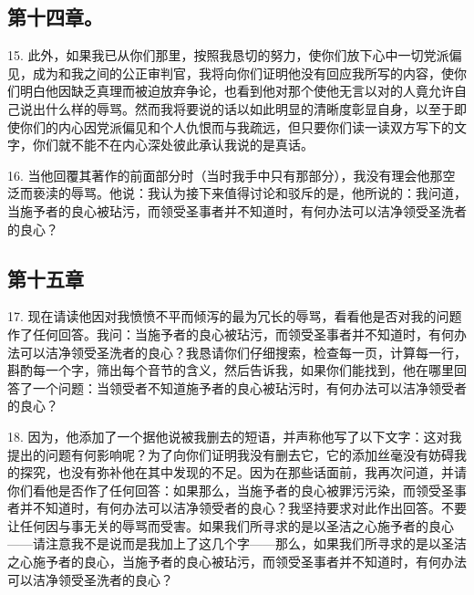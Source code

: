 \subsection{第十四章。}

15. 此外，如果我已从你们那里，按照我恳切的努力，使你们放下心中一切党派偏见，成为和我之间的公正审判官，我将向你们证明他没有回应我所写的内容，使你们明白他因缺乏真理而被迫放弃争论，也看到他对那个使他无言以对的人竟允许自己说出什么样的辱骂。然而我将要说的话以如此明显的清晰度彰显自身，以至于即使你们的内心因党派偏见和个人仇恨而与我疏远，但只要你们读一读双方写下的文字，你们就不能不在内心深处彼此承认我说的是真话。\par

16. 当他回覆其著作的前面部分时（当时我手中只有那部分），我没有理会他那空泛而亵渎的辱骂。他说：我认为接下来值得讨论和驳斥的是，他所说的：我问道，当施予者的良心被玷污，而领受圣事者并不知道时，有何办法可以洁净领受圣洗者的良心？\par


\subsection{第十五章}

17. 现在请读他因对我愤愤不平而倾泻的最为冗长的辱骂，看看他是否对我的问题作了任何回答。我问：当施予者的良心被玷污，而领受圣事者并不知道时，有何办法可以洁净领受圣洗者的良心？我恳请你们仔细搜索，检查每一页，计算每一行，斟酌每一个字，筛出每个音节的含义，然后告诉我，如果你们能找到，他在哪里回答了一个问题：当领受者不知道施予者的良心被玷污时，有何办法可以洁净领受者的良心？\par

18. 因为，他添加了一个据他说被我删去的短语，并声称他写了以下文字：这对我提出的问题有何影响呢？为了向你们证明我没有删去它，它的添加丝毫没有妨碍我的探究，也没有弥补他在其中发现的不足。因为在那些话面前，我再次问道，并请你们看他是否作了任何回答：如果那么，当施予者的良心被罪污污染，而领受圣事者并不知道时，有何办法可以洁净领受者的良心？我坚持要求对此作出回答。不要让任何因与事无关的辱骂而受害。如果我们所寻求的是以圣洁之心施予者的良心——请注意我不是说而是我加上了这几个字——那么，如果我们所寻求的是以圣洁之心施予者的良心，当施予者的良心被玷污，而领受圣事者并不知道时，有何办法可以洁净领受圣洗者的良心？\par

